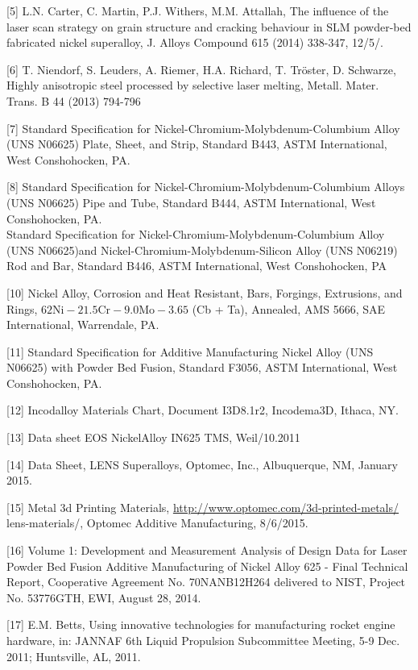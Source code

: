 \documentclass[10pt]{article}
\begin{document}
[5] L.N. Carter, C. Martin, P.J. Withers, M.M. Attallah, The influence of the laser scan strategy on grain structure and cracking behaviour in SLM powder-bed fabricated nickel superalloy, J. Alloys Compound 615 (2014) 338-347, 12/5/.

[6] T. Niendorf, S. Leuders, A. Riemer, H.A. Richard, T. Tröster, D. Schwarze, Highly anisotropic steel processed by selective laser melting, Metall. Mater. Trans. B 44 (2013) 794-796

[7] Standard Specification for Nickel-Chromium-Molybdenum-Columbium Alloy (UNS N06625) Plate, Sheet, and Strip, Standard B443, ASTM International, West Conshohocken, PA.

[8] Standard Specification for Nickel-Chromium-Molybdenum-Columbium Alloys (UNS N06625) Pipe and Tube, Standard B444, ASTM International, West Conshohocken, PA.\\
[9] Standard Specification for Nickel-Chromium-Molybdenum-Columbium Alloy (UNS N06625)and Nickel-Chromium-Molybdenum-Silicon Alloy (UNS N06219) Rod and Bar, Standard B446, ASTM International, West Conshohocken, PA

[10] Nickel Alloy, Corrosion and Heat Resistant, Bars, Forgings, Extrusions, and Rings, $62 \mathrm{Ni}-21.5 \mathrm{Cr}-9.0 \mathrm{Mo}-3.65$ (Cb + Ta), Annealed, AMS 5666, SAE International, Warrendale, PA.

[11] Standard Specification for Additive Manufacturing Nickel Alloy (UNS N06625) with Powder Bed Fusion, Standard F3056, ASTM International, West Conshohocken, PA.

[12] Incodalloy Materials Chart, Document I3D8.1r2, Incodema3D, Ithaca, NY.

[13] Data sheet EOS NickelAlloy IN625 TMS, Weil/10.2011

[14] Data Sheet, LENS Superalloys, Optomec, Inc., Albuquerque, NM, January 2015.

[15] Metal 3d Printing Materials, \href{http://www.optomec.com/3d-printed-metals/}{http://www.optomec.com/3d-printed-metals/} lens-materials/, Optomec Additive Manufacturing, 8/6/2015.

[16] Volume 1: Development and Measurement Analysis of Design Data for Laser Powder Bed Fusion Additive Manufacturing of Nickel Alloy 625 - Final Technical Report, Cooperative Agreement No. 70NANB12H264 delivered to NIST, Project No. 53776GTH, EWI, August 28, 2014.

[17] E.M. Betts, Using innovative technologies for manufacturing rocket engine hardware, in: JANNAF 6th Liquid Propulsion Subcommittee Meeting, 5-9 Dec. 2011; Huntsville, AL, 2011.
\end{document}
